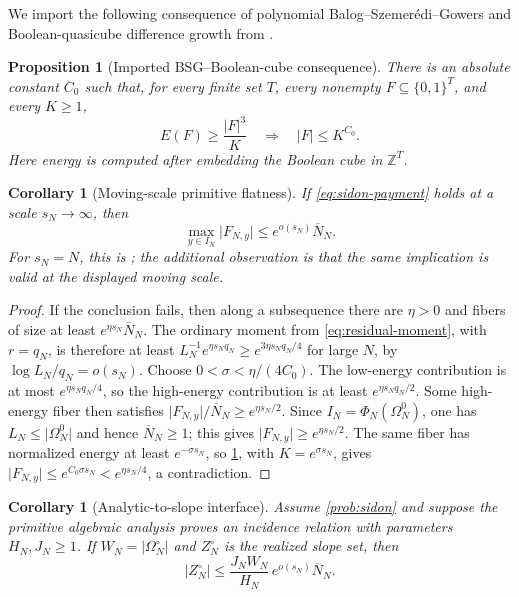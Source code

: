 \documentclass[a4paper,11pt]{amsart}
\newtheorem{proposition}[theorem]{Proposition}
\newtheorem{corollary}[theorem]{Corollary}
\theoremstyle{remark}
\newcommand{\Z}{\mathbb Z}
\newcommand{\barN}{\overline N}
\newcommand{\abs}[1]{\lvert#1\rvert}
\begin{document}
We import the following consequence of polynomial
Balog--Szemer\'edi--Gowers and Boolean-quasicube difference growth from
\cite[Proposition~10.4]{ChoShortening}.

\begin{proposition}[Imported BSG--Boolean-cube consequence]
\label{prop:high-energy}
There is an absolute constant \(C_0\) such that, for every finite set \(T\),
every nonempty \(F\subseteq\{0,1\}^T\), and every \(K\ge1\),
\[
 E(F)\ge\frac{\abs F^3}{K}\quad\Longrightarrow\quad
 \abs F\le K^{C_0}.                                \tag{3.11}\label{eq:high-energy}
\]
Here energy is computed after embedding the Boolean cube in \(\Z^T\).
\end{proposition}

\begin{corollary}[Moving-scale primitive flatness]
\label{cor:gowers-cube}
If \eqref{eq:sidon-payment} holds at a scale \(s_N\to\infty\), then
\[
 \max_{y\in I_N}\abs{F_{N,y}}\le e^{o(s_N)}\barN_N. \tag{3.12}\label{eq:scale-flatness}
\]
For \(s_N=N\), this is \cite[Theorem~10.5]{ChoShortening}; the additional
observation is that the same implication is valid at the displayed moving
scale.
\end{corollary}

\begin{proof}
If the conclusion fails, then along a subsequence there are \(\eta>0\) and
fibers of size at least \(e^{\eta s_N}\barN_N\).  The ordinary moment from
\eqref{eq:residual-moment}, with \(r=q_N\), is therefore at least
\(L_N^{-1}e^{\eta s_Nq_N}\ge e^{3\eta s_Nq_N/4}\) for large \(N\), by
\(\log L_N/q_N=o(s_N)\).  Choose \(0<\sigma<\eta/(4C_0)\).  The low-energy
contribution is at most \(e^{\eta s_Nq_N/4}\), so the high-energy
contribution is at least \(e^{\eta s_Nq_N/2}\).  Some high-energy fiber then
satisfies \(\abs{F_{N,y}}/\barN_N\ge e^{\eta s_N/2}\).  Since
\(I_N=\Phi_N(\Omega_N^0)\), one has \(L_N\le\abs{\Omega_N^0}\) and hence
\(\barN_N\ge1\); this gives \(\abs{F_{N,y}}\ge e^{\eta s_N/2}\).
The same fiber has normalized energy at least \(e^{-\sigma s_N}\), so
\cref{prop:high-energy}, with \(K=e^{\sigma s_N}\), gives
\(\abs{F_{N,y}}\le e^{C_0\sigma s_N}<e^{\eta s_N/4}\), a contradiction.
\end{proof}

\begin{corollary}[Analytic-to-slope interface]\label{cor:analytic-to-slope}
Assume \cref{prob:sidon} and suppose the primitive algebraic analysis proves
an incidence relation with parameters \(H_N,J_N\ge1\).  If
\(W_N=\abs{\Omega_N^\circ}\) and \(Z_N^\circ\) is the realized slope set,
then
\[
 \abs{Z_N^\circ}\le
 \frac{J_NW_N}{H_N}\,e^{o(s_N)}\barN_N.           \tag{3.13}\label{eq:analytic-slope}
\]
\end{corollary}
\end{document}
